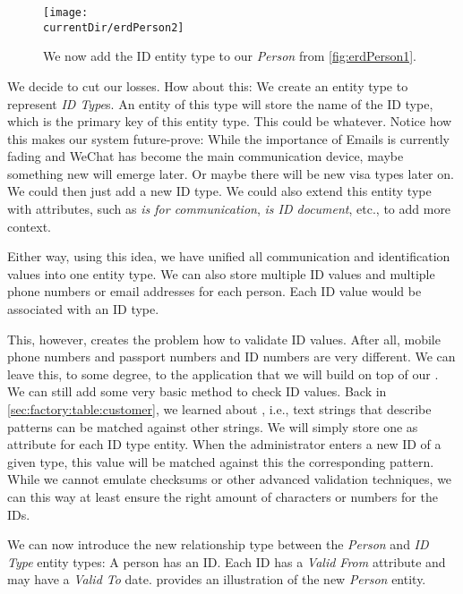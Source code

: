 \begin{figure}%
\centering%
\texttt{[image: \\currentDir/erdPerson2]}%
\caption{We now add the ID entity type to our \emph{Person}  from \cref{fig:erdPerson1}.}%
\label{fig:erdPerson2}%
\end{figure}%

We decide to cut our losses.
How about this:
We create an entity type to represent \emph{ID Type}s.
An entity of this type will store the name of the ID type, which is the primary key of this entity type.
This could be           whatever.
Notice how this makes our system future-prove:
While the importance of Emails is currently fading and WeChat has become the main communication device, maybe something new will emerge later.
Or maybe there will be new visa types later on.
We could then just add a new ID type.
We could also extend this entity type with attributes, such as \emph{is for communication}, \emph{is ID document}, etc., to add more context.

Either way, using this idea, we have unified all communication and identification values into one entity type.
We can also store multiple ID values and multiple phone numbers or email addresses for each person.
Each ID value would be associated with an ID type.

This, however, creates the problem how to validate ID values.
After all, mobile phone numbers and passport numbers and ID numbers are very different.
We can leave this, to some degree, to the application that we will build on top of our \db.
We can still add some very basic method to check ID values.
Back in \cref{sec:factory:table:customer}, we learned about , i.e., text strings that describe patterns can be matched against other strings.
We will simply store one  as  attribute for each ID type entity.
When the administrator enters a new ID of a given type, this value will be matched against this the corresponding pattern.
While we cannot emulate checksums or other advanced validation techniques, we can this way at least ensure the right amount of characters or numbers for the IDs.

We can now introduce the new relationship type between the \emph{Person} and \emph{ID Type} entity types:
A person has an ID.
Each ID has a \emph{Valid From} attribute and may have a \emph{Valid To} date.
 provides an illustration of the new \emph{Person} entity.%
%
\FloatBarrier%
\endhsection%
%
